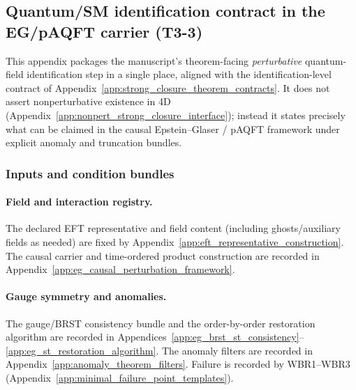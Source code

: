 \subsection{Quantum/SM identification contract in the EG/pAQFT carrier (T3-3)}
\label{app:quantum_sm_identification_contract}

\AuditTag This appendix packages the manuscript's theorem-facing \emph{perturbative} quantum-field identification step in a single place, aligned with the identification-level contract of Appendix~\ref{app:strong_closure_theorem_contracts}.
It does not assert nonperturbative existence in 4D (Appendix~\ref{app:nonpert_strong_closure_interface}); instead it states precisely what can be claimed in the causal Epstein--Glaser / pAQFT framework under explicit anomaly and truncation bundles.

\subsubsection{Inputs and condition bundles}
\paragraph{Field and interaction registry.}
\MathTag The declared EFT representative and field content (including ghosts/auxiliary fields as needed) are fixed by Appendix~\ref{app:eft_representative_construction}.
The causal carrier and time-ordered product construction are recorded in Appendix~\ref{app:eg_causal_perturbation_framework}.

\paragraph{Gauge symmetry and anomalies.}
\AuditTag The gauge/BRST consistency bundle and the order-by-order restoration algorithm are recorded in Appendices~\ref{app:eg_brst_st_consistency}--\ref{app:eg_st_restoration_algorithm}.
The anomaly filters are recorded in Appendix~\ref{app:anomaly_theorem_filters}.
Failure is recorded by WBR1--WBR3 (Appendix~\ref{app:minimal_failure_point_templates}).

